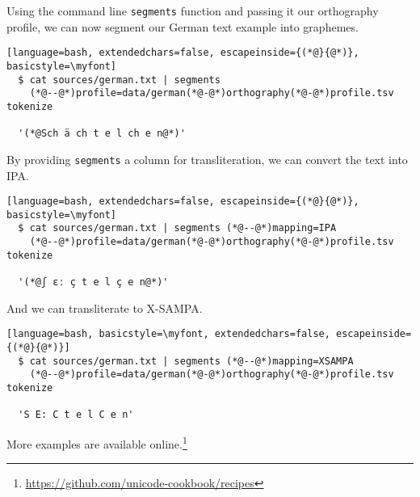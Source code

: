 \documentclass[output=book,nonflat,modfonts,
citecolor=brown,
		]{langsci/langscibook}\usepackage[]{graphicx}\usepackage[]{color}
\begin{document}
\noindent Using the command line \texttt{segments} function and passing it our orthography profile, we can now segment our German text example into graphemes.

\begin{lstlisting}[language=bash, extendedchars=false, escapeinside={(*@}{@*)}, basicstyle=\myfont]
  $ cat sources/german.txt | segments 
    (*@--@*)profile=data/german(*@-@*)orthography(*@-@*)profile.tsv tokenize

  '(*@Sch ä ch t e l ch e n@*)'
\end{lstlisting}

\noindent By providing \texttt{segments} a column for transliteration, we can convert the text into IPA.

\begin{lstlisting}[language=bash, extendedchars=false, escapeinside={(*@}{@*)}, basicstyle=\myfont]
  $ cat sources/german.txt | segments (*@--@*)mapping=IPA 
	(*@--@*)profile=data/german(*@-@*)orthography(*@-@*)profile.tsv tokenize

  '(*@ʃ ɛː ç t e l ç e n@*)'
\end{lstlisting}

\noindent And we can transliterate to X-SAMPA.

\begin{lstlisting}[language=bash, basicstyle=\myfont, extendedchars=false, escapeinside={(*@}{@*)}]
  $ cat sources/german.txt | segments (*@--@*)mapping=XSAMPA 
	(*@--@*)profile=data/german(*@-@*)orthography(*@-@*)profile.tsv tokenize

  'S E: C t e l C e n'
\end{lstlisting}

\noindent More examples are available online.\footnote{\url{https://github.com/unicode-cookbook/recipes}}
\end{document}
